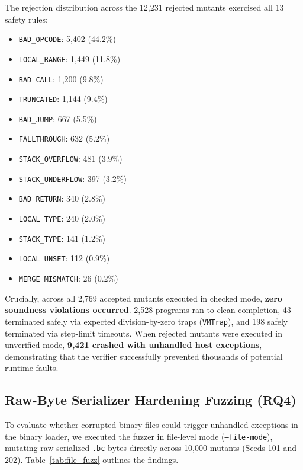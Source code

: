\documentclass[conference]{IEEEtran}
\begin{document}
The rejection distribution across the 12,231 rejected mutants exercised all 13 safety rules:
\begin{itemize}
    \item \texttt{BAD\_OPCODE}: 5,402 (44.2\%)
    \item \texttt{LOCAL\_RANGE}: 1,449 (11.8\%)
    \item \texttt{BAD\_CALL}: 1,200 (9.8\%)
    \item \texttt{TRUNCATED}: 1,144 (9.4\%)
    \item \texttt{BAD\_JUMP}: 667 (5.5\%)
    \item \texttt{FALLTHROUGH}: 632 (5.2\%)
    \item \texttt{STACK\_OVERFLOW}: 481 (3.9\%)
    \item \texttt{STACK\_UNDERFLOW}: 397 (3.2\%)
    \item \texttt{BAD\_RETURN}: 340 (2.8\%)
    \item \texttt{LOCAL\_TYPE}: 240 (2.0\%)
    \item \texttt{STACK\_TYPE}: 141 (1.2\%)
    \item \texttt{LOCAL\_UNSET}: 112 (0.9\%)
    \item \texttt{MERGE\_MISMATCH}: 26 (0.2\%)
\end{itemize}

Crucially, across all 2,769 accepted mutants executed in checked mode, \textbf{zero soundness violations occurred}. 2,528 programs ran to clean completion, 43 terminated safely via expected division-by-zero traps (\texttt{VMTrap}), and 198 safely terminated via step-limit timeouts. When rejected mutants were executed in unverified mode, \textbf{9,421 crashed with unhandled host exceptions}, demonstrating that the verifier successfully prevented thousands of potential runtime faults.

\subsection{Raw-Byte Serializer Hardening Fuzzing (RQ4)}
To evaluate whether corrupted binary files could trigger unhandled exceptions in the binary loader, we executed the fuzzer in file-level mode (\texttt{--file-mode}), mutating raw serialized \texttt{.bc} bytes directly across 10,000 mutants (Seeds 101 and 202). Table~\ref{tab:file_fuzz} outlines the findings.
\end{document}
